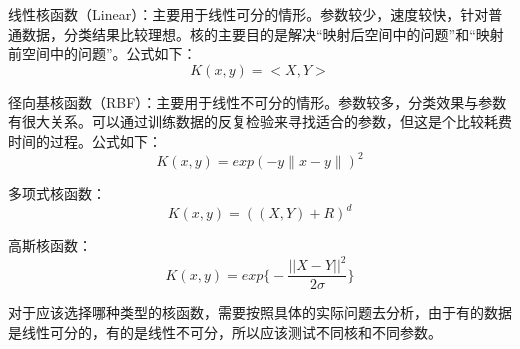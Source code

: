 线性核函数（Linear）：主要用于线性可分的情形。参数较少，速度较快，针对普通数据，分类结果比较理想。核的主要目的是解决“映射后空间中的问题”和“映射前空间中的问题”。公式如下：
\begin{equation}
K(x,y) = < X,Y > 
\end{equation} 
   
径向基核函数（RBF）：主要用于线性不可分的情形。参数较多，分类效果与参数有很大关系。可以通过训练数据的反复检验来寻找适合的参数，但这是个比较耗费时间的过程。公式如下：
\begin{equation}
K(x,y) = exp(-y\parallel x-y\parallel)^{2}
\end{equation}  

多项式核函数：
\begin{equation}
K(x,y) = ((X,Y)+R)^{d} 
\end{equation}

高斯核函数：
\begin{equation}
K(x,y) = exp\big\{-\frac{||X-Y||^{2}}{2\sigma}\big\}
\end{equation} 

对于应该选择哪种类型的核函数，需要按照具体的实际问题去分析，由于有的数据是线性可分的，有的是线性不可分，所以应该测试不同核和不同参数。



















